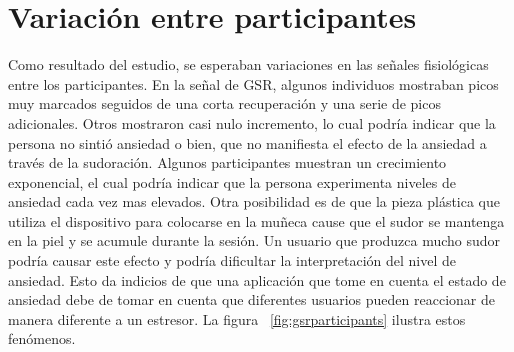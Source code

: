 

\section{Variaci\'on entre participantes}
Como resultado del estudio, se esperaban variaciones en las se\~nales fisiol\'ogicas entre los participantes. En la se\~nal de GSR, algunos individuos mostraban picos muy marcados seguidos de una corta recuperaci\'on y una serie de picos adicionales. Otros mostraron casi nulo incremento, lo cual podr\'ia indicar que la persona no sinti\'o ansiedad o bien, que no manifiesta el efecto de la ansiedad a trav\'es de la sudoraci\'on. Algunos participantes muestran un crecimiento exponencial, el cual podr\'ia indicar que la persona experimenta niveles de ansiedad cada vez mas elevados. Otra posibilidad es de que la pieza pl\'astica que utiliza el dispositivo para colocarse en la mu\~neca cause que el sudor se mantenga en la piel y se acumule durante la sesi\'on. Un usuario que produzca mucho sudor podr\'ia causar este efecto y podr\'ia dificultar la interpretaci\'on del nivel de ansiedad. Esto da indicios de que una aplicaci\'on que tome en cuenta el estado de ansiedad debe de tomar en cuenta que diferentes usuarios pueden reaccionar de manera diferente a un estresor. La figura ~\ref{fig:gsrparticipants} ilustra estos fen\'omenos.


